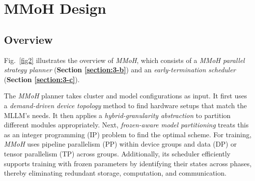 \documentclass[conference]{IEEEtran}
\begin{document}
\section{MMoH Design}

\subsection{Overview}

Fig.~\ref{fig2} illustrates the overview of \textit{MMoH}, which consists of a \textit{MMoH parallel strategy planner} (\textbf{Section \ref{section:3-b}}) and an \textit{early-termination scheduler} (\textbf{Section \ref{section:3-c}}).

The \textit{MMoH} planner takes cluster and model configurations as input. It first uses a \textit{demand-driven device topology} method to find hardware setups that match the MLLM's needs. It then applies a \textit{hybrid-granularity abstraction} to partition different modules appropriately. Next, \textit{frozen-aware model partitioning} treats this as an integer programming (IP) problem to find the optimal scheme. For training, \textit{MMoH} uses pipeline parallelism (PP) within device groups and data (DP) or tensor parallelism (TP) across groups. Additionally, its scheduler efficiently supports training with frozen parameters by identifying their states across phases, thereby eliminating redundant storage, computation, and communication.
\end{document}
